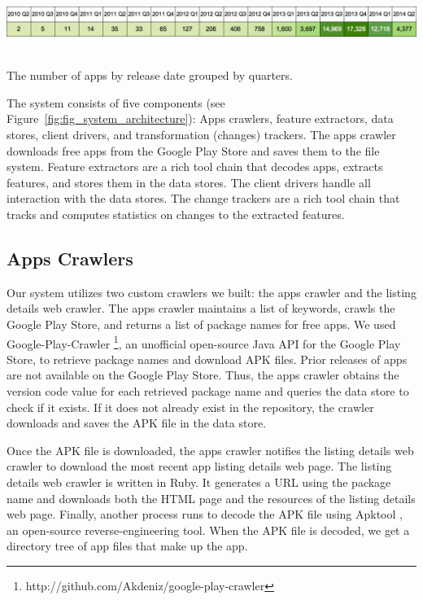 \begin{table}[!t]
	\includegraphics[width=16cm, height=2cm]{figures/design-pattern-changes/release_date}
	\caption{The number of apps by release date grouped by quarters.}
	\label{tbl:release_date}
\end{table}

\par The system consists of five components (see Figure~\ref{fig:fig_system_architecture}): Apps crawlers, feature extractors, data stores, client drivers, and transformation (changes) trackers.
The apps crawler downloads free apps from the Google Play Store and saves them to the file system.
Feature extractors are a rich tool chain that decodes apps, extracts features, and stores them in the data stores.
The client drivers handle all interaction with the data stores.
The change trackers are a rich tool chain that tracks and computes statistics on changes to the extracted features.

\subsection{Apps Crawlers}
Our system utilizes two custom crawlers we built: the apps crawler and the listing details web crawler.
The apps crawler maintains a list of keywords, crawls the Google Play Store, and returns a list of package names for free apps.
We used Google-Play-Crawler \footnote{http://github.com/Akdeniz/google-play-crawler}, an unofficial open-source Java API for the Google Play Store, to retrieve package names and download APK files.
Prior releases of apps are not available on the Google Play Store.
Thus, the apps crawler obtains the version code value for each retrieved package name and queries the data store to check if it exists.
If it does not already exist in the repository, the crawler downloads and saves the APK file in the data store.

\par Once the APK file is downloaded, the apps crawler notifies the listing details web crawler to download the most recent app listing details web page.
The listing details web crawler is written in Ruby.
It generates a URL using the package name and downloads both the HTML page and the resources of the listing details web page.
Finally, another process runs to decode the APK file using Apktool \cite{apktool}, an open-source reverse-engineering tool.
When the APK file is decoded, we get a directory tree of app files that make up the app.

